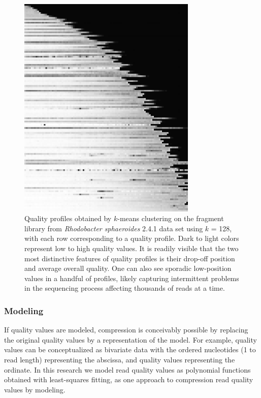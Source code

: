 \documentclass{bioinfo}
\begin{document}
\begin{methods}
\begin{figure}[!tpb]%
\centerline{\includegraphics[width=3.35in]{profiles_128.png}}
\caption{Quality profiles obtained by $k$-means clustering on the
  fragment library from \textit{Rhodobacter sphaeroides} 2.4.1 data
  set using $k$ = 128, with each row corresponding to a quality
  profile. Dark to light colors represent low to high quality
  values. It is readily visible that the two most distinctive features
  of quality profiles is their drop-off position and average overall
  quality. One can also see sporadic low-position values in a handful
  of profiles, likely capturing intermittent problems in the
  sequencing process affecting thousands of reads at a
  time.}\label{fig:profiles_128}
\end{figure}

\subsubsection{Modeling}

If quality values are modeled, compression is conceivably possible by
replacing the original quality values by a representation of the
model. For example, quality values can be conceptualized as bivariate
data with the ordered nucleotides (1 to read length) representing the
abscissa, and quality values representing the ordinate. In this
research we model read quality values as polynomial functions obtained
with least-squares fitting, as one approach to compression read
quality values by modeling.


\end{methods}
\end{document}
